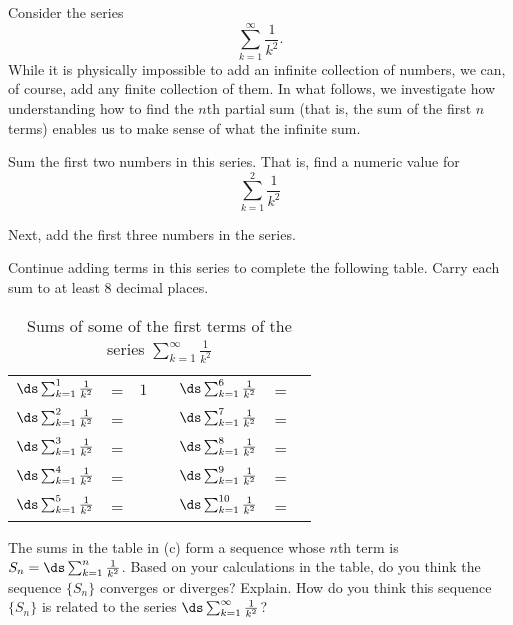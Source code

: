 \begin{activity} \label{8.3.Act1} Consider the series
\[\sum_{k=1}^{\infty} \frac{1}{k^2}.\]
While it is physically impossible to add an infinite collection of numbers, we can, of course, add any finite collection of them.  In what follows, we investigate how understanding how to find the $n$th partial sum (that is, the sum of the first $n$ terms) enables us to make sense of what the infinite sum.
\ba
\item Sum the first two numbers in this series. That is, find a numeric value for
\[\sum_{k=1}^2 \frac{1}{k^2}\]

\item Next, add the first three numbers in the series.

\item Continue adding terms in this series to complete the following table. Carry each sum to at least 8 decimal places.
\begin{table}[ht]
\begin{center}
\renewcommand{\arraystretch}{1.5}
\begin{tabular}{r c p{0.5in} p{1.0in} r c p{0.5in}}
$\ds \sum_{k=1}^{1} \frac{1}{k^2}$   & = & $1$  &   &$\ds \sum_{k=1}^{6} \frac{1}{k^2}$   &= & \\
$\ds \sum_{k=1}^{2} \frac{1}{k^2}$   & = &     &   &$\ds \sum_{k=1}^{7} \frac{1}{k^2}$   & = & \\
$\ds \sum_{k=1}^{3} \frac{1}{k^2}$   & = &     &   &$\ds \sum_{k=1}^{8} \frac{1}{k^2}$   & = &  \\
$\ds \sum_{k=1}^{4} \frac{1}{k^2}$   & = &     &   &$\ds \sum_{k=1}^{9} \frac{1}{k^2}$   &  = &\\
$\ds \sum_{k=1}^{5} \frac{1}{k^2}$   & = &     &   &$\ds \sum_{k=1}^{10} \frac{1}{k^2}$  & = & \\
\end{tabular}
\caption{Sums of some of the first terms of the series $\sum_{k=1}^{\infty} \frac{1}{k^2}$} \label{T:8.3.1_part_sum_ex}
\end{center}
\end{table}

\item The sums in the table in (c) form a sequence whose $n$th term is $S_n = \ds \sum_{k=1}^{n} \frac{1}{k^2}$. Based on your calculations in the table, do you think the sequence $\{S_n\}$ converges or diverges? Explain. How do you think this sequence $\{S_n\}$ is related to the series $\ds \sum_{k=1}^{\infty} \frac{1}{k^2}$?

\ea
\end{activity}

